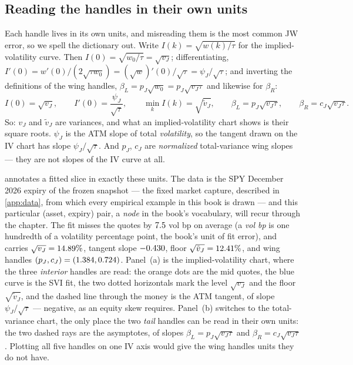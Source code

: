 \subsection*{Reading the handles in their own units}

Each handle lives in its own units, and misreading them is the most
common JW error, so we spell the dictionary out.  Write
$I(k)=\sqrt{w(k)/\tau}$ for the implied-volatility curve.  Then
$I(0)=\sqrt{w_0/\tau}=\sqrt{v_J}$; differentiating,
$I'(0)=w'(0)/(2\sqrt{\tau w_0})=(\sqrt w)'(0)/\sqrt\tau=\psi_J/\sqrt\tau$;
and inverting the definitions of the wing handles,
$\beta_L=p_J\sqrt{w_0}=p_J\sqrt{v_J\tau}$ and likewise for $\beta_R$:
\begin{equation}
I(0)=\sqrt{v_J},\qquad
I'(0)=\frac{\psi_J}{\sqrt\tau},\qquad
\min_kI(k)=\sqrt{\tilde v_J},\qquad
\beta_L=p_J\sqrt{v_J\tau},\qquad
\beta_R=c_J\sqrt{v_J\tau}.
\label{eq:jwunits}
\end{equation}
So: $v_J$ and $\tilde v_J$ are variances, and what an
implied-volatility chart shows is their square roots.  $\psi_J$ is the
ATM slope of total \emph{volatility}, so the tangent drawn on the IV
chart has slope $\psi_J/\sqrt\tau$.  And $p_J$, $c_J$ are
\emph{normalized} total-variance wing slopes --- they are not slopes of
the IV curve at all.

 annotates a fitted slice in exactly these units.
The data is the SPY December 2026 expiry of the frozen snapshot ---
the fixed market capture, described in \cref{app:data}, from which
every empirical example in this book is drawn --- and this particular
(asset, expiry) pair, a \emph{node} in the book's vocabulary, will
recur through the chapter.  The fit misses the quotes by
$7.5$ vol bp on average (a \emph{vol bp} is one hundredth
of a volatility percentage point, the book's unit of fit error), and
carries $\sqrt{v_J}=14.89\%$, tangent slope
$-0.430$, floor
$\sqrt{\tilde v_J}=12.41\%$, and wing handles
$(p_J,c_J)=(1.384,0.724)$.  Panel~(a) is the
implied-volatility chart, where the three \emph{interior} handles are
read: the orange dots are the mid quotes, the blue curve is the SVI
fit, the two dotted horizontals mark the level $\sqrt{v_J}$ and the
floor $\sqrt{\tilde v_J}$, and the dashed line through the money is the
ATM tangent, of slope $\psi_J/\sqrt\tau$ --- negative, as an equity
skew requires.  Panel~(b) switches to the total-variance chart, the
only place the two \emph{tail} handles can be read in their own units:
the two dashed rays are the asymptotes, of slopes $\beta_L=p_J\sqrt{v_J\tau}$
and $\beta_R=c_J\sqrt{v_J\tau}$.  Plotting all five handles on one IV
axis would give the wing handles units they do not have.

